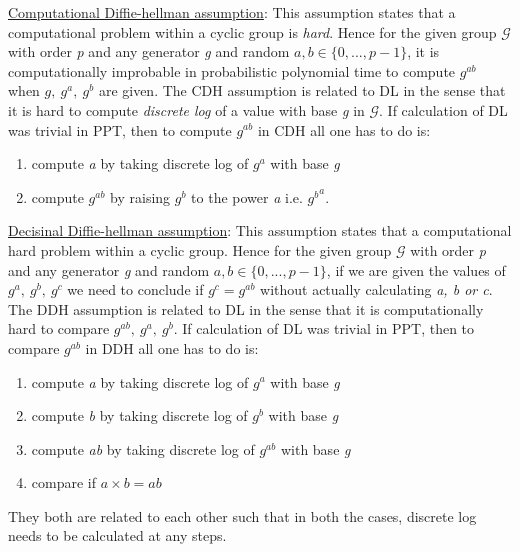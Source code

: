 \documentclass{article}
\begin{document}
        \underline{Computational Diffie-hellman assumption}: This assumption states that a computational problem within a cyclic group is \emph{hard}. Hence for the given group $\mathcal{G}$ with order \emph{p} and any generator \emph{g} and random $a, b \in \{0, ... , p-1\}$, it is computationally improbable in probabilistic polynomial time to compute $g^{ab}$ when $g,\ g^a,\ g^b$ are given. \newline
        The CDH assumption is related to DL in the sense that it is hard to compute \emph{discrete log} of a value with base \emph{g} in $\mathcal{G}$. If calculation of DL was trivial in PPT, then to compute $g^{ab}$ in CDH all one has to do is:\newline
        \begin{enumerate}
            \item compute \emph{a} by taking discrete log of $g^a$ with base \emph{g}
            \item compute $g^{ab}$ by raising $g^b$ to the power \emph{a} i.e. ${g^b}^a$.
        \end{enumerate}
        
        \underline{Decisinal Diffie-hellman assumption}: This assumption states that a computational hard problem within a cyclic group. Hence for the given group $\mathcal{G}$ with order \emph{p} and any generator \emph{g} and random $a, b \in \{0, ... , p-1\}$, if we are given the values of $g^a,\ g^b,\ g^c$ we need to conclude if $g^c = g^{ab}$ without actually calculating \emph{a, b or c}.\newline
        The DDH assumption is related to DL in the sense that it is computationally hard to compare $g^{ab},\ g^a,\ g^b$. If calculation of DL was trivial in PPT, then to compare $g^{ab}$ in DDH all one has to do is:\newline
        \begin{enumerate}
            \item compute \emph{a} by taking discrete log of $g^a$ with base \emph{g}
            \item compute \emph{b} by taking discrete log of $g^b$ with base \emph{g}
            \item compute \emph{ab} by taking discrete log of $g^{ab}$ with base \emph{g}
            \item compare if $a \times{b} = ab$
        \end{enumerate}
        
        They both are related to each other such that in both the cases, discrete log needs to be calculated at any steps.\newline
        
\end{document}

